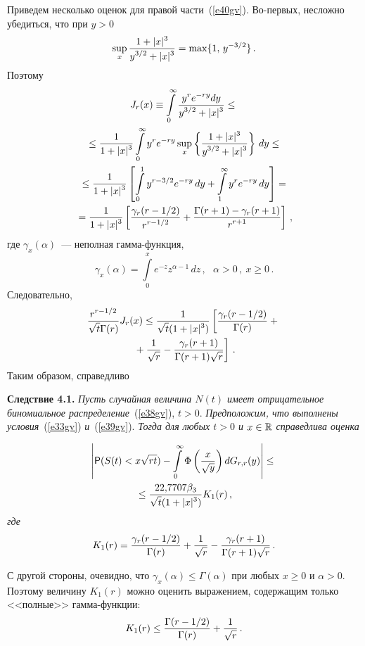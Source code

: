 \begin{multicols}{2}
Приведем несколько оценок для правой час\-ти~(\ref{e40gv}). Во-пер\-вых,
несложно убедиться, что при $y>0$
$$
\sup_x\fr{1+|x|^3}{y^{3/2}+|x|^3}=\max\{1,\,y^{-3/2}\}\,.
$$
Поэтому
\begin{multline*}
J_r(x)\equiv\int\limits_0^{\infty}\fr{y^re^{-ry}dy}{y^{3/2}+|x|^3}\le{}\\
{}\le
\fr{1}{1+|x|^3}
\int\limits_0^{\infty}y^re^{-ry}\sup_x\left\{\fr{1+|x|^3}{y^{3/2}+|x|^3}\right\}\,dy\le{}\\
{}\le
\fr{1}{1+|x|^3}\left[\int\limits_0^1y^{r-3/2}e^{-ry}\,dy+\int\limits_1^{\infty}y^re^{-ry}\,dy\right]
={}\\
{}=
\fr{1}{1+|x|^3}\left[\fr{\gamma_r(r-{1}/{2})}{r^{r-1/2}}+\fr{\Gamma(r+1)-\gamma_r(r+1)}{r^{r+1}}\right]\,,
\end{multline*}
где $\gamma_x(\alpha)$~--- неполная гам\-ма-функ\-ция,
$$
\gamma_x(\alpha)=\int\limits_0^x e^{-z}z^{\alpha-1}\,dz\,,\ \ \
\alpha>0\,,\ x\ge0\,.
$$
Следовательно,
\begin{multline*}
\fr{r^{r-1/2}}{\sqrt{t}\Gamma(r)}J_r(x)\le\fr{1}{\sqrt{t}(1+|x|^3)}\left[
\fr{\gamma_r(r-{1}/{2})}{\Gamma(r)}+{}\right.\\
\left.{}+
\fr{1}{\sqrt{r}}-\fr{\gamma_r(r+1)}{\Gamma(r+1)\sqrt{r}}\right]\,.
\end{multline*}
Таким образом, справедливо

\smallskip

\noindent
\textbf{Следствие 4.1.} \textit{Пусть случайная величина $N(t)$ имеет
отрицательное биномиальное распределение}~(\ref{e38gv}), $t>0$.
\textit{Предположим, что выполнены условия}~(\ref{e33gv}) \textit{и}~(\ref{e39gv}). \textit{Тогда для
любых $t>0$ и $x\in\R$ справедлива оценка}

\noindent
\begin{multline*}
\left|{\sf P}(S(t)<x\sqrt{rt})-\int\limits_{0}^{\infty}
\Phi\left(\fr{x}{\sqrt{y}}\right)dG_{r,r}(y)\right|\le{}\\
{}\le \fr{22{,}7707\beta_3}{\sqrt{t}(1+|x|^3)}
K_1(r)\,,
\end{multline*}
\textit{где}
$$
K_1(r)=\fr{\gamma_r(r-{1}/{2})}{\Gamma(r)}+
\fr{1}{\sqrt{r}}-\fr{\gamma_r(r+1)}{\Gamma(r+1)\sqrt{r}}\,.
$$

\smallskip

С другой стороны, очевидно, что
$\gamma_x(\alpha)\le\Gamma(\alpha)$ при любых $x\ge0$ и
$\alpha>0$. Поэтому величину $K_1(r)$ можно оценить выражением,
содержащим только <<полные>> гам\-ма-функ\-ции:
\begin{equation}
K_1(r)\le \fr{\Gamma(r-{1}/{2})}{\Gamma(r)}+
\fr{1}{\sqrt{r}}\,.\label{e41gv}
\end{equation}


\end{multicols}
